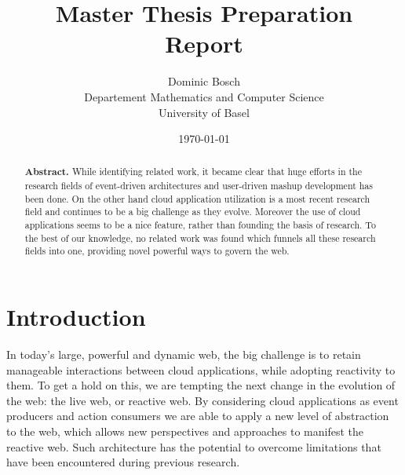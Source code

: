 \documentclass[11pt]{article}%
\begin{document}
\title{Master Thesis Preparation\\Report}
\date{\today}
\author{Dominic Bosch \\ Departement Mathematics and Computer Science \\ University of Basel}

\maketitle

\renewcommand{\abstractname}{}
\begin{abstract}
\textbf{Abstract.}
While identifying related work, it became clear that huge efforts in the research fields of event-driven architectures and user-driven mashup development has been done. On the other hand cloud application utilization is a most recent research field and continues to be a big challenge as they evolve. Moreover the use of cloud applications seems to be a nice feature, rather than founding the basis of research. To the best of our knowledge, no related work was found which funnels all these research fields into one, providing novel powerful ways to govern the web.
\end{abstract}

\section{Introduction}
In today's large, powerful and dynamic web, the big challenge is to retain manageable interactions between cloud applications, while adopting reactivity to them. To get a hold on this, we are tempting the next change in the evolution of the web: the live web, or reactive web. By considering cloud applications as event producers and action consumers we are able to apply a new level of abstraction to the web, which allows new perspectives and approaches to manifest the reactive web. Such architecture has the potential to overcome limitations that have been encountered during previous research.
\end{document}
